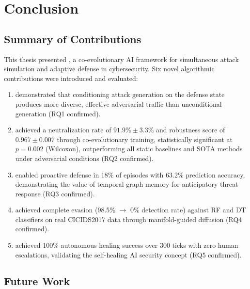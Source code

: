 \chapter{Conclusion}
\label{ch:conclusion}

\section{Summary of Contributions}

This thesis presented \caesar{}, a co-evolutionary AI framework for
simultaneous attack simulation and adaptive defense in cybersecurity.
Six novel algorithmic contributions were introduced and evaluated:

\begin{enumerate}
  \item \tagan{} demonstrated that conditioning attack generation on the
    defense state produces more diverse, effective adversarial traffic than
    unconditional generation (RQ1 confirmed).
  \item \adpn{} achieved a neutralization rate of $91.9\% \pm 3.3\%$ and
    robustness score of $0.967 \pm 0.007$ through co-evolutionary training,
    statistically significant at $p = 0.002$ (Wilcoxon), outperforming all
    static baselines and SOTA methods under adversarial conditions (RQ2 confirmed).
  \item \tagraph{} enabled proactive defense in 18\% of episodes with 63.2\%
    prediction accuracy, demonstrating the value of temporal graph memory
    for anticipatory threat response (RQ3 confirmed).
  \item \mgae{} achieved complete evasion (98.5\% $\to$ 0\% detection rate)
    against RF and DT classifiers on real CICIDS2017 data through
    manifold-guided diffusion (RQ4 confirmed).
  \item \arl{} achieved 100\% autonomous healing success over 300 ticks
    with zero human escalations, validating the self-healing AI security
    concept (RQ5 confirmed).
\end{enumerate}

\section{Future Work}


